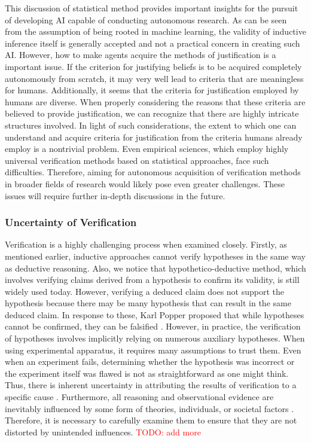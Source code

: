 \documentclass{book}
\begin{document}
This discussion of statistical method provides important insights for the pursuit of developing AI capable of conducting autonomous research. As can be seen from the assumption of being rooted in machine learning, the validity of inductive inference itself is generally accepted and not a practical concern in creating such AI. However, how to make agents acquire the methods of justification is a important issue. If the criterion for justifying beliefs is to be acquired completely autonomously from scratch, it may very well lead to criteria that are meaningless for humans. Additionally, it seems that the criteria for justification employed by humans are diverse. When properly considering the reasons that these criteria are believed to provide justification, we can recognize that there are highly intricate structures involved. In light of such considerations, the extent to which one can understand and acquire criteria for justification from the criteria humans already employ is a nontrivial problem. Even empirical sciences, which employ highly universal verification methods based on statistical approaches, face such difficulties. Therefore, aiming for autonomous acquisition of verification methods in broader fields of research would likely pose even greater challenges. These issues will require further in-depth discussions in the future.

\subsubsection{Uncertainty of Verification}
Verification is a highly challenging process when examined closely. Firstly, as mentioned earlier, inductive approaches cannot verify hypotheses in the same way as deductive reasoning. Also, we notice that hypothetico-deductive method, which involves verifying claims derived from a hypothesis to confirm its validity, is still widely used today. However, verifying a deduced claim does not support the hypothesis because there may be many hypothesis that can result in the same deduced claim. In response to these, Karl Popper proposed that while hypotheses cannot be confirmed, they can be falsified \cite{sep-scientific-method}. However, in practice, the verification of hypotheses involves implicitly relying on numerous auxiliary hypotheses. When using experimental apparatus, it requires many assumptions to trust them. Even when an experiment fails, determining whether the hypothesis was incorrect or the experiment itself was flawed is not as straightforward as one might think. Thus, there is inherent uncertainty in attributing the results of verification to a specific cause \cite{chalmers2013thing,sep-physics-experiment,sep-scientific-underdetermination}. Furthermore, all reasoning and observational evidence are inevitably influenced by some form of theories, individuals, or societal factors \cite{sep-science-theory-observation}. Therefore, it is necessary to carefully examine them to ensure that they are not distorted by unintended influences. \textcolor{red}{TODO: add more}
\end{document}
